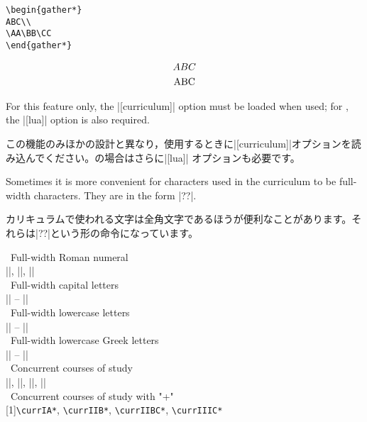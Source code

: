 \documentclass[%
fleqn,%
paper=a4paper,%
fontsize=10pt,%
open_bracket_pos=zenkakunibu_nibu,%
hanging_punctuation,%
]%
{jlreq}
\newenvironment{translateing}%
{\begin{multicolpar}{2}}
{\end{multicolpar}\vspace{\baselineskip}}
\let\code\texttt
\DeclareRobustCommand{\commandtojskip}{\hspace{2.40554pt plus 1.49994pt minus 0.59998pt}}
\begin{document}
\newpage
\begin{lstlisting}
\begin{gather*}
ABC\\
\AA\BB\CC
\end{gather*}
\end{lstlisting}

\begin{macroexample}
\begin{gather*}
ABC\\
\mathrm{A}\mathrm{B}\mathrm{C}
\end{gather*}
\end{macroexample}


\begin{translateing}
For this feature only, the |[curriculum]| option must be loaded when used; for \LuaTeX, the |[lua]| option is also required.

この機能のみほかの設計と異なり，使用するときに|[curriculum]|オプションを読み込んでください。\LuaTeX の場合はさらに|[lua]| オプションも必要です。

Sometimes it is more convenient for characters used in the curriculum to be full-width characters. They are in the form |\curr??|.

カリキュラムで使われる文字は全角文字であるほうが便利なことがあります。それらは\commandtojskip|\curr??|\commandtojskip という形の命令になっています。

\noindent
\textbullet\ Full-width Roman numeral \\\hfill|\currI|, |\currII|, |\currIII|\\
\textbullet\ Full-width capital letters \\\hfill|\currA| -- |\currZ|\\
\textbullet\ Full-width lowercase letters \\\hfill|\curra| -- |\currz|\\
\textbullet\ Full-width lowercase Greek letters \\\hfill|\curralpha| -- |\curromega|\\
\textbullet\ Concurrent courses of study \\\hfill|\currIA|, |\currIIB|, |\currIIBC|, |\currIIIC|\\
\textbullet\ Concurrent courses of study with "+" \\\hfill\scalebox{0.9}[1]{\code{\textbackslash currIA*}, \code{\textbackslash currIIB*}, \code{\textbackslash currIIBC*}, \code{\textbackslash currIIIC*}}


\end{translateing}
\end{document}
